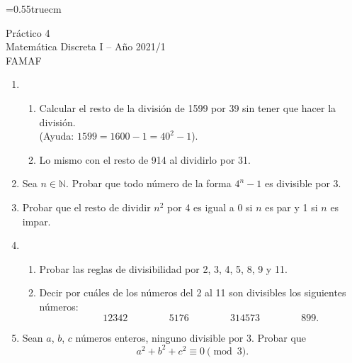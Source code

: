 \documentclass[a4paper,12pt,twoside,spanish,reqno]{amsbook}
\numberwithin{equation}{section}
\begin{document}
    \baselineskip=0.55truecm %
    


{\bf \begin{center}\large Práctico 4 \\ Matemática Discreta I -- Año 2021/1 \\ FAMAF \end{center}}



\begin{enumerate}
\setlength\itemsep{1.1em}

\item  
\begin{enumerate}
    \item Calcular el resto de la divisi\'on de 1599 por 39 sin tener que hacer la divisi\'on. \\(Ayuda: $1599=1600-1=40^2-1$).
    \item Lo mismo con el resto de 914 al dividirlo por 31.
\end{enumerate}


\item Sea $n\in\mathbb N$. Probar que todo n\'umero de la forma $4^n-1$ es divisible por 3.

\item Probar que el resto de dividir $n^2$ por 4 es igual a 0 si $n$ es par y 1 si $n$ es impar.

%

\item
\begin{enumerate}
\item
Probar las reglas de divisibilidad por 2, 3, 4, 5, 8, 9 y 11.%
\item Decir por cu\'ales de los n\'umeros del 2 al 11 son divisibles los siguientes n\'umeros:
$$ \qquad 12342  \, \qquad   \qquad  5176 \, \qquad \qquad  314573\,  \qquad  \qquad  899.$$
\end{enumerate}


\item Sean $a$, $b$, $c$ n\'umeros enteros, ninguno divisible por 3. Probar que 
$$a^2 + b^2 + c^2\equiv 0 \pmod 3.$$%



\end{enumerate}
\end{document}
